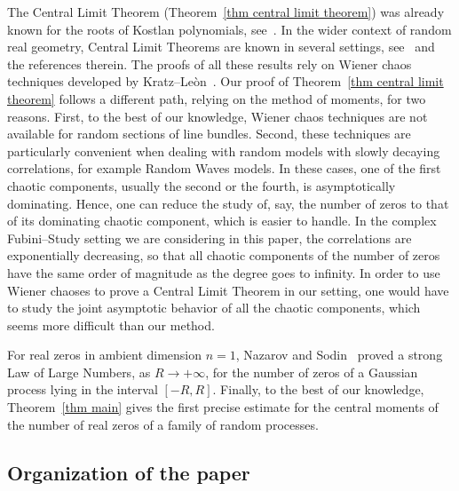 \documentclass[AHL,Unicode,longabstracts,published]{cedram}
\begin{document}
The Central Limit Theorem (Theorem~\ref{thm central limit theorem}) was already known for the roots of Kostlan polynomials, see~\cite{Dal2015}. In the wider context of random real geometry, Central Limit Theorems are known in several settings, see~\cite{AADL2018a,AADL2018b,Ros2019} and the references therein. The proofs of all these results rely on Wiener chaos techniques developed by Kratz--Leòn~\cite{KL2001}. Our proof of Theorem~\ref{thm central limit theorem} follows a different path, relying on the method of moments, for two reasons. First, to the best of our knowledge, Wiener chaos techniques are not available for random sections of line bundles. Second, these techniques are particularly convenient when dealing with random models with slowly decaying correlations, for example Random Waves models. In these cases, one of the first chaotic components, usually the second or the fourth, is asymptotically dominating. Hence, one can reduce the study of, say, the number of zeros to that of its dominating chaotic component, which is easier to handle. In the complex Fubini--Study setting we are considering in this paper, the correlations are exponentially decreasing, so that all chaotic components of the number of zeros have the same order of magnitude as the degree goes to infinity. In order to use Wiener chaoses to prove a Central Limit Theorem in our setting, one would have to study the joint asymptotic behavior of all the chaotic components, which seems more difficult than our method.

For real zeros in ambient dimension $n=1$, Nazarov and Sodin~\cite{NS2016} proved a strong Law of Large Numbers, as $R \to +\infty$, for the number of zeros of a Gaussian process lying in the interval $[-R,R]$. Finally, to the best of our knowledge, Theorem~\ref{thm main} gives the first precise estimate for the central moments of the number of real zeros of a family of random processes.


\subsection*{Organization of the paper}
\end{document}
